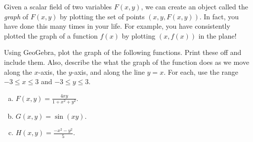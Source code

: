 \documentclass[12pt]{article} %
\begin{document}
\newpage
\begin{problem}
Given a scalar field of two variables $F(x,y)$, we can create an object called the \emph{graph} of $F(x,y)$ by plotting the set of points $(x,y,F(x,y))$. In fact, you have done this many times in your life. For example, you have consistently plotted the graph of a function $f(x)$ by plotting $(x,f(x))$ in the plane!  

Using GeoGebra, plot the graph of the following functions. Print these off and include them.  Also, describe the what the graph of the function does as we move along the $x$-axis, the $y$-axis, and along the line $y=x$. For each, use the range $-3\leq x \leq 3$ and $-3\leq y \leq 3$.
\begin{enumerate}[(a)]
	\item $F(x,y) = \frac{4xy}{1+x^2+y^2}$.
	\item $G(x,y) = \sin(xy)$.
	\item $H(x,y) = \frac{-x^2-y^2}{5}$.
\end{enumerate}
\end{problem}
\end{document}
